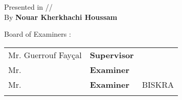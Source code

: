 \begin{titlepage}
\begin{center}
\par\end{center}

\begin{center}
Presented in \quad{}/\quad{}/\quad{}\\
By  \textbf{Nouar Kherkhachi Houssam}
\par\end{center}

\begin{center}
\vspace*{1.5cm}

\par\end{center}

Board of Examiners :\\
 

\begin{minipage}[t]{1\columnwidth}%
\begin{tabular}{lll}
Mr. Guerrouf Fay\c{c}al & \textbf{\small{}Supervisor} & \tabularnewline
Mr.  & \textbf{\small{}Examiner} & \tabularnewline
Mr.  & \textbf{\small{}Examiner} & {\small{}BISKRA }\tabularnewline
 &  & \tabularnewline
\end{tabular}%
\end{minipage}

\end{titlepage} 

